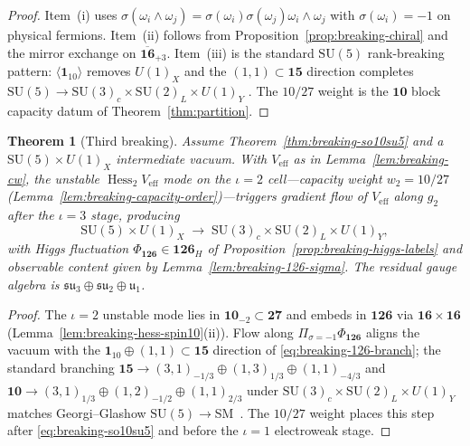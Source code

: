 \documentclass[aps,prd,onecolumn,amsmath,amssymb,nofootinbib,11pt]{revtex4-2}
\numberwithin{equation}{section}
\theoremstyle{plain}
\newtheorem{theorem}{Theorem}[section]
\theoremstyle{definition}
\theoremstyle{remark}
\newcommand{\Hess}{\operatorname{Hess}}
\begin{document}
\begin{proof}
Item~(i) uses $\sigma(\omega_i\wedge\omega_j)=\sigma(\omega_i)\sigma(\omega_j)
\omega_i\wedge\omega_j$ with $\sigma(\omega_i)=-1$ on physical fermions.
Item~(ii) follows from Proposition~\ref{prop:breaking-chiral} and the mirror
exchange on $\overline{\mathbf{16}}_{+3}$. Item~(iii) is the standard
$\mathrm{SU}(5)$ rank-breaking pattern: $\langle\mathbf{1}_{10}\rangle$ removes
$U(1)_X$ and the $(1,1)\subset\mathbf{15}$ direction completes
$\mathrm{SU}(5)\to\mathrm{SU}(3)_c\times\mathrm{SU}(2)_L\times U(1)_Y$
\cite{GeorgiGlashow1974,Witten1985}. The $10/27$ weight is the $\mathbf{10}$
block capacity datum of Theorem~\ref{thm:partition}.
\end{proof}

\begin{theorem}[Third breaking]\label{thm:breaking-su5sm}
Assume Theorem~\ref{thm:breaking-so10su5} and a
$\mathrm{SU}(5)\times U(1)_X$ intermediate vacuum. With $V_{\mathrm{eff}}$ as
in Lemma~\ref{lem:breaking-cw}, the unstable $\Hess_2 V_{\mathrm{eff}}$ mode on
the $\iota=2$ cell---capacity weight $w_2=10/27$
(Lemma~\ref{lem:breaking-capacity-order})---triggers gradient flow of
$V_{\mathrm{eff}}$ along $g_2$ after the $\iota=3$ stage, producing
\begin{equation}\label{eq:breaking-su5sm}
  \mathrm{SU}(5)\times U(1)_X
  \;\longrightarrow\;
  \mathrm{SU}(3)_c\times\mathrm{SU}(2)_L\times U(1)_Y,
\end{equation}
with Higgs fluctuation $\Phi_{\mathbf{126}}\in\mathbf{126}_H$ of
Proposition~\ref{prop:breaking-higgs-labels} and observable content given by
Lemma~\ref{lem:breaking-126-sigma}. The residual gauge algebra is
$\mathfrak{su}_3\oplus\mathfrak{su}_2\oplus\mathfrak{u}_1$.
\end{theorem}

\begin{proof}
The $\iota=2$ unstable mode lies in $\mathbf{10}_{-2}\subset\mathbf{27}$ and
embeds in $\mathbf{126}$ via $\mathbf{16}\times\mathbf{16}$
(Lemma~\ref{lem:breaking-hess-spin10}(ii)). Flow along
$\Pi_{\sigma=-1}\Phi_{\mathbf{126}}$ aligns the vacuum with the
$\mathbf{1}_{10}\oplus(1,1)\subset\mathbf{15}$ direction of
\eqref{eq:breaking-126-branch}; the standard branching
$\mathbf{15}\to(3,1)_{-1/3}\oplus(1,3)_{1/3}\oplus(1,1)_{-4/3}$ and
$\mathbf{10}\to(3,1)_{1/3}\oplus(1,2)_{-1/2}\oplus(1,1)_{2/3}$ under
$\mathrm{SU}(3)_c\times\mathrm{SU}(2)_L\times U(1)_Y$ matches Georgi--Glashow
$\mathrm{SU}(5)\to$SM~\cite{GeorgiGlashow1974}. The $10/27$ weight places this
step after \eqref{eq:breaking-so10su5} and before the $\iota=1$
electroweak stage.
\end{proof}
\end{document}
